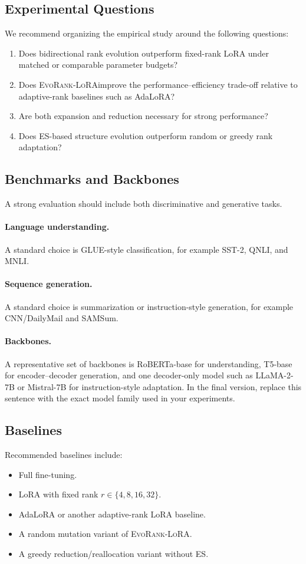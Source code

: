 \documentclass{article}
\newcommand{\method}{\textsc{EvoRank-LoRA}}
\begin{document}
\subsection{Experimental Questions}
We recommend organizing the empirical study around the following questions:
\begin{enumerate}[leftmargin=1.2em]
    \item Does bidirectional rank evolution outperform fixed-rank LoRA under matched or comparable parameter budgets?
    \item Does \method improve the performance--efficiency trade-off relative to adaptive-rank baselines such as AdaLoRA?
    \item Are both expansion and reduction necessary for strong performance?
    \item Does ES-based structure evolution outperform random or greedy rank adaptation?
\end{enumerate}

\subsection{Benchmarks and Backbones}
A strong evaluation should include both discriminative and generative tasks.
\paragraph{Language understanding.}
A standard choice is GLUE-style classification, for example SST-2, QNLI, and MNLI.
\paragraph{Sequence generation.}
A standard choice is summarization or instruction-style generation, for example CNN/DailyMail and SAMSum.
\paragraph{Backbones.}
A representative set of backbones is RoBERTa-base for understanding, T5-base for encoder--decoder generation, and one decoder-only model such as LLaMA-2-7B or Mistral-7B for instruction-style adaptation. In the final version, replace this sentence with the exact model family used in your experiments.

\subsection{Baselines}
Recommended baselines include:
\begin{itemize}[leftmargin=1.2em]
    \item Full fine-tuning.
    \item LoRA with fixed rank $r \in \{4, 8, 16, 32\}$.
    \item AdaLoRA or another adaptive-rank LoRA baseline.
    \item A random mutation variant of \method.
    \item A greedy reduction/reallocation variant without ES.
\end{itemize}
\end{document}
